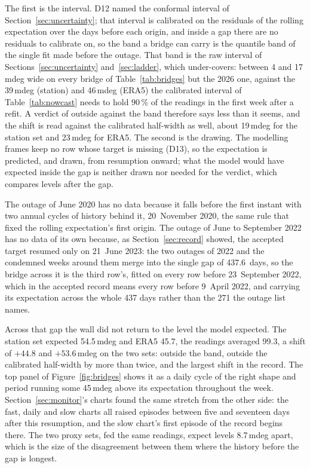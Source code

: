 \documentclass[11pt,a4paper]{article}
\begin{document}
The first is the interval. D12 named the conformal interval of
Section~\ref{sec:uncertainty}; that interval is calibrated on the residuals
of the rolling expectation over the days before each origin, and inside a
gap there are no residuals to calibrate on, so the band a bridge can carry is
the quantile band of the single fit made before the outage. That band is the
raw interval of Sections~\ref{sec:uncertainty} and~\ref{sec:ladder}, which
under-covers: between 4 and 17\,mdeg wide on every bridge of
Table~\ref{tab:bridges} but the 2026 one, against the 39\,mdeg (station) and 46\,mdeg (ERA5)
the calibrated interval of Table~\ref{tab:nowcast} needs to hold 90\,\% of
the readings in the first week after a refit. A verdict of outside against
the band therefore says less than it seems, and the shift is read against the
calibrated half-width as well, about 19\,mdeg for the station set and
23\,mdeg for ERA5. The second is the drawing. The modelling frames keep no
row whose target is missing (D13), so the expectation is predicted, and
drawn, from resumption onward; what the model would have expected inside the
gap is neither drawn nor needed for the verdict, which compares levels after
the gap.

The outage of June 2020 has no data because it falls before the first instant
with two annual cycles of history behind it, 20~November 2020, the same rule
that fixed the rolling expectation's first origin. The outage of June to
September 2022 has no data of its own because, as Section~\ref{sec:record}
showed, the accepted target resumed only on 21~June 2023: the two outages of
2022 and the condemned weeks around them merge into the single gap of
437.6~days, so the bridge across it is the third row's, fitted on every row
before 23~September 2022, which in the accepted record means every row before
9~April 2022, and carrying its expectation across the whole 437 days rather
than the 271 the outage list names.

Across that gap the wall did not return to the level the model expected. The
station set expected 54.5\,mdeg and ERA5 45.7, the readings averaged 99.3, a
shift of $+44.8$ and $+53.6$\,mdeg on the two sets: outside the band, outside
the calibrated half-width by more than twice, and the largest shift in the
record. The top panel of Figure~\ref{fig:bridges} shows it as a daily cycle
of the right shape and period running some 45\,mdeg above its expectation
throughout the week. Section~\ref{sec:monitor}'s charts found the same
stretch from the other side: the fast, daily and slow charts all raised
episodes between five and seventeen days after this resumption, and the slow
chart's first episode of the record begins there. The two proxy sets, fed
the same readings, expect levels 8.7\,mdeg apart, which is the size of the
disagreement between them where the history before the gap is longest.
\end{document}
